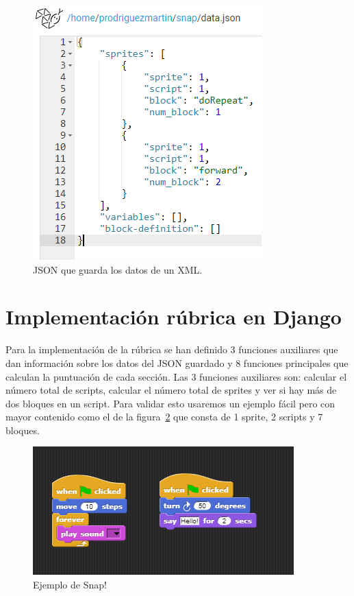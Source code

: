 \documentclass[a4paper, 12pt]{book}
\begin{document}
 \begin{figure}[h]
            \centering
            \includegraphics[scale=0.55]{img/json.PNG}
            \caption{JSON que guarda los datos de un XML.}
            \label{figura:JSON}
        \end{figure}
 
 \section{Implementación rúbrica en Django}
 Para la implementación de la rúbrica se han definido 3 funciones auxiliares que dan información sobre los datos del JSON guardado y 8 funciones principales que calculan la puntuación de cada sección. Las 3 funciones auxiliares son: calcular el número total de scripts, calcular el número total de sprites y ver si hay más de dos bloques en un script. Para validar esto usaremos un ejemplo fácil pero con mayor contenido como el de la figura~\ref{figura:snap-ej} que consta de 1 sprite, 2 scripts y 7 bloques.
    \begin{figure}[h]
            \centering
            \includegraphics[scale=0.6]{img/ej_rubrica.PNG}
            \caption{Ejemplo de Snap!}
            \label{figura:snap-ej}
        \end{figure}
        
\end{document}
